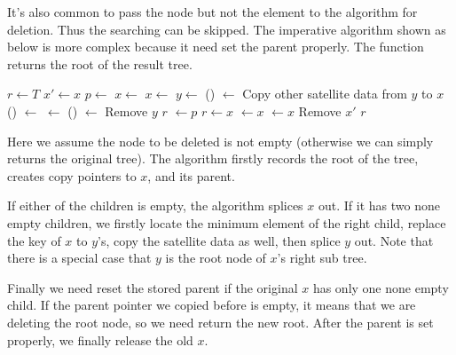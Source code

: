 \documentclass{article}
\begin{document}
It's also common to pass the node but not the element to the
algorithm for deletion. Thus the searching can be skipped.
The imperative algorithm shown as below is more complex because
it need set the parent properly. The function returns the
root of the result tree.

\begin{algorithmic}[1]
  \State $r \gets T$
  \State $x' \gets x$ 
  \State $p \gets $ 
    \State $x \gets $ 
    \State $x \gets $ 
  \Else
    \State  $y \gets $ ()
    \State {} $\gets$ 
    \State Copy other satellite data from $y$ to $x$
      \State {}() $\gets$ 
    \Else
      \State {} $\gets$ 
    \EndIf
      \State {}() $\gets$ 
    \EndIf
    \State Remove $y$
    \State \Return $r$
  \EndIf
    \State {} $\gets p$
  \EndIf
    \State $r \gets x$
  \Else
      \State {} $\gets x$
    \Else
      \State {} $\gets x$
    \EndIf
  \EndIf
  \State Remove $x'$
  \State \Return $r$
\EndFunction
\end{algorithmic}

Here we assume the node to be deleted is not empty (otherwise we can
simply returns the original tree). The algorithm firstly records
the root of the tree, creates copy pointers to $x$, and its parent.

If either of the children is empty, the algorithm splices $x$ out.
If it has two none empty children, we firstly locate the minimum element
of the right child, replace the key of $x$ to $y$'s, copy the
satellite data as well, then splice $y$ out. Note that there is a
special case that $y$ is the root node of $x$'s right sub tree.

Finally we need reset the stored parent if the original $x$ has only
one none empty child.
If the parent pointer we copied before is empty, it
means that we are deleting the root node, so we need return the new root. After
the parent is set properly, we finally release the old $x$.
\end{document}
